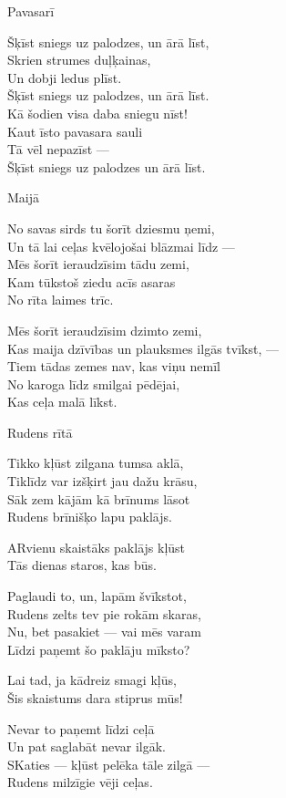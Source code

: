 \documentclass[14pt]{extarticle}
\begin{document}
{{\newpage

{\large \sc Pavasarī}

Šķīst sniegs uz palodzes, un ārā līst,\\
Skrien strumes duļķainas,\\
Un dobji ledus plīst.\\
Šķīst sniegs uz palodzes, un ārā līst.\\
Kā šodien visa daba sniegu nīst!\\
Kaut īsto pavasara sauli\\
Tā vēl nepazīst ---\\
Šķīst sniegs uz palodzes un ārā līst.


\newpage

{\large \sc Maijā}

No savas sirds tu šorīt dziesmu ņemi,\\
Un tā lai ceļas kvēlojošai blāzmai līdz ---\\
Mēs šorīt ieraudzīsim tādu zemi,\\
Kam tūkstoš ziedu acīs asaras\\
No rīta laimes trīc.

Mēs šorīt ieraudzīsim dzimto zemi,\\
Kas maija dzīvības un plauksmes ilgās tvīkst, ---\\
Tiem tādas zemes nav, kas viņu nemīl\\
No karoga līdz smilgai pēdējai,\\
Kas ceļa malā līkst.


\newpage
{\large \sc Rudens rītā}

Tikko kļūst zilgana tumsa aklā,\\
Tiklīdz var izšķirt jau dažu krāsu,\\
Sāk zem kājām kā brīnums lāsot\\
Rudens brīnišķo lapu paklājs.

ARvienu skaistāks paklājs kļūst\\
Tās dienas staros, kas būs.

Paglaudi to, un, lapām švīkstot,\\
Rudens zelts tev pie rokām skaras,\\
Nu, bet pasakiet --- vai mēs varam\\
Līdzi paņemt šo paklāju mīksto?

Lai tad, ja kādreiz smagi kļūs,\\
Šis skaistums dara stiprus mūs!

Nevar to paņemt līdzi ceļā\\
Un pat saglabāt nevar ilgāk.\\
SKaties --- kļūst pelēka tāle zilgā ---\\
Rudens milzīgie vēji ceļas.

}}
\end{document}
